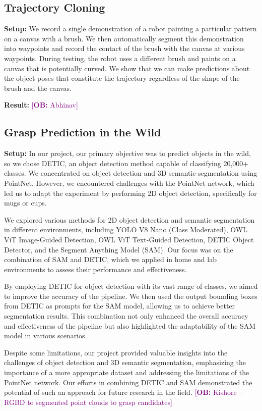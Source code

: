 \documentclass{article}
\newcommand{\ob}[1]{\textcolor{purple}{[\textbf{OB:} #1]}}
\begin{document}
\subsection{Trajectory Cloning}
\label{sec:exp:trajectory}

\textbf{Setup:} We record a single demonstration of a robot painting a particular pattern on a canvas with a brush. We then automatically segment this demonstration into waypoints and record the contact of the brush with the canvas at various waypoints. During testing, the robot uses a different brush and paints on a canvas that is potentially curved. We show that we can make predictions about the object poses that constitute the trajectory regardless of the shape of the brush and the canvas.

\textbf{Result:} \ob{Abhinav}

\subsection{Grasp Prediction in the Wild}
\label{sec:exp:wild}

\textbf{Setup:}
In our project, our primary objective was to predict objects in the wild, so we chose DETIC, an object detection method capable of classifying 20,000+ classes. We concentrated on object detection and 3D semantic segmentation using PointNet. However, we encountered challenges with the PointNet network, which led us to adapt the experiment by performing 2D object detection, specifically for mugs or cups.



We explored various methods for 2D object detection and semantic segmentation in different environments, including YOLO V8 Nano (Class Moderated), OWL ViT Image-Guided Detection, OWL ViT Text-Guided Detection, DETIC Object Detector, and the Segment Anything Model (SAM). Our focus was on the combination of SAM and DETIC, which we applied in home and lab environments to assess their performance and effectiveness.

By employing DETIC for object detection with its vast range of classes, we aimed to improve the accuracy of the pipeline. We then used the output bounding boxes from DETIC as prompts for the SAM model, allowing us to achieve better segmentation results. This combination not only enhanced the overall accuracy and effectiveness of the pipeline but also highlighted the adaptability of the SAM model in various scenarios.

Despite some limitations, our project provided valuable insights into the challenges of object detection and 3D semantic segmentation, emphasizing the importance of a more appropriate dataset and addressing the limitations of the PointNet network. Our efforts in combining DETIC and SAM demonstrated the potential of such an approach for future research in the field.
\ob{Kishore -- RGBD to segmented point clouds to grasp candidates}
\end{document}
